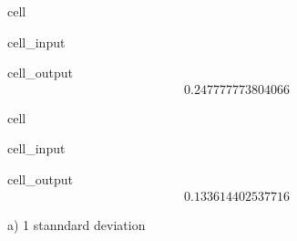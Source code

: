 \documentclass[letterpaper,10pt,english]{jupyterBook}
\begin{document}
\begin{sphinxuseclass}{cell}\begin{sphinxVerbatimInput}

\begin{sphinxuseclass}{cell_input}
\begin{sphinxVerbatim}[commandchars=\\\{\}]
\end{sphinxVerbatim}

\end{sphinxuseclass}\end{sphinxVerbatimInput}
\begin{sphinxVerbatimOutput}

\begin{sphinxuseclass}{cell_output}\begin{equation*}
\begin{split}0.247777773804066\end{split}
\end{equation*}
\end{sphinxuseclass}\end{sphinxVerbatimOutput}

\end{sphinxuseclass}
\begin{sphinxuseclass}{cell}\begin{sphinxVerbatimInput}

\begin{sphinxuseclass}{cell_input}
\begin{sphinxVerbatim}[commandchars=\\\{\}]
\end{sphinxVerbatim}

\end{sphinxuseclass}\end{sphinxVerbatimInput}
\begin{sphinxVerbatimOutput}

\begin{sphinxuseclass}{cell_output}\begin{equation*}
\begin{split}0.133614402537716\end{split}
\end{equation*}
\end{sphinxuseclass}\end{sphinxVerbatimOutput}

\end{sphinxuseclass}
\sphinxAtStartPar
a) 1 stanndard deviation
\end{document}
